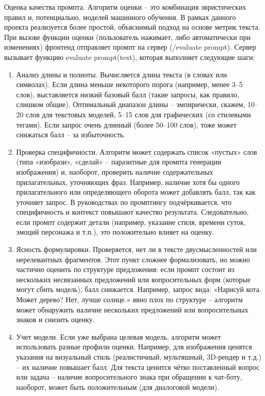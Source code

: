 Оценка качества промпта. Алгоритм оценки – это комбинация эвристических правил и, потенциально, моделей машинного обучения. В рамках данного проекта реализуется более простой, объяснимый подход на основе метрик текста. При вызове функции оценки (пользователь нажимает, либо автоматически при изменениях) фронтенд отправляет промпт на сервер (/evaluate prompt). Сервер вызывает функцию evaluate prompt(text), которая выполняет следующие шаги:
\begin{enumerate}[label=\arabic*]
    \item Анализ длины и полноты. Вычисляется длина текста (в словах или символах). Если длина меньше некоторого порога (например, менее 3–5 слов), выставляется низкий базовый балл (такие запросы, как правило, слишком общие). Оптимальный диапазон длины – эмпирически, скажем, 10–20 слов для текстовых моделей, 5–15 слов для графических (со стилевыми тегами). Если запрос очень длинный (более 50–100 слов), тоже может снижаться балл – за избыточность.
    \item Проверка специфичности. Алгоритм может содержать список «пустых» слов (типа «изобрази», «сделай» – паразитные для промпта генерации изображения) и, наоборот, проверить наличие содержательных прилагательных, уточняющих фраз. Например, наличие хотя бы одного прилагательного или определяющего оборота может добавлять балл, так как уточняет запрос. В руководствах по промптингу подчёркивается, что специфичность и контекст повышают качество результата\cite{promptingguide:basics}. Следовательно, если промпт содержит детали (например, указание стиля, времени суток, эмоций персонажа и т.п.), это положительно влияет на оценку.
    \item Ясность формулировки. Проверяется, нет ли в тексте двусмысленностей или нерелевантных фрагментов. Этот пункт сложнее формализовать, но можно частично оценить по структуре предложения: если промпт состоит из нескольких несвязанных предложений или вопросительных форм (которые могут сбить модель), балл снижается. Например, запрос вида: «Нарисуй кота. Может дерево? Нет, лучше солнце.» явно плох по структуре – алгоритм может обнаружить наличие нескольких предложений или вопросительных знаков и снизить оценку.
    \item Учет модели. Если уже выбрана целевая модель, алгоритм может использовать разные профили оценки. Например, для изображения ценятся указания на визуальный стиль (реалистичный, мультяшный, 3D-рендер и т.д.) – их наличие повышает балл. Для текста ценится чётко поставленный вопрос или задача – наличие вопросительного знака при обращении к чат-боту, наоборот, может быть положительным (для диалоговой модели).

\end{enumerate}
